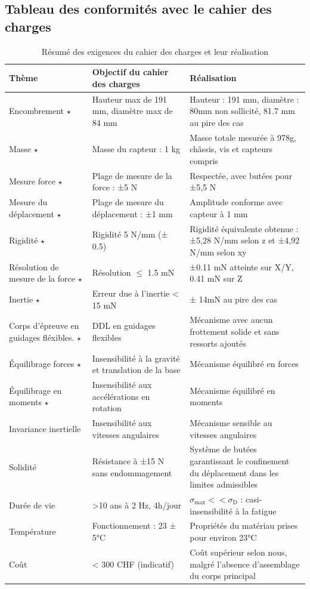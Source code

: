 \documentclass[a4paper, 11pt]{article} %
\begin{document}
\subsection{Tableau des conformités avec le cahier des charges}
\begin{table}[H]
\centering
\renewcommand{\arraystretch}{1.4} %
\begin{tabularx}{\textwidth}{|>{\raggedright\arraybackslash}p{3.5cm}|>{\raggedright\arraybackslash}X|>{\raggedright\arraybackslash}X|}
\hline
\textbf{Thème} & \textbf{Objectif du cahier des charges} & \textbf{Réalisation} \\
\hline
Encombrement $\star$  & Hauteur max de 191 mm, diamètre max de 84 mm & Hauteur : 191 mm, diamètre : 80mm non sollicité, 81.7 mm au pire des cas\\
\hline
Masse $\star$ & Masse du capteur : 1 kg & Masse totale mesurée à 978g, châssis, vis et capteurs compris  \\
\hline
Mesure force $\star$ & Plage de mesure de la force : ±5 N & Respectée, avec butées pour ±5,5 N \\
\hline
Mesure du déplacement $\star$ & Plage de mesure du déplacement : ±1 mm & Amplitude conforme avec capteur à 1 mm \\
\hline
Rigidité $\star$ & Rigidité 5 N/mm (± 0.5)& Rigidité équivalente obtenue : ±5,28 N/mm selon z et ±4,92 N/mm selon xy \\
\hline
Résolution de mesure de la force $\star$ & Résolution $\leq$ 1.5 mN & ±0.11 mN atteinte sur X/Y, 0.41 mN sur Z \\
\hline
Inertie $\star$ & Erreur due à l'inertie < 15 mN & ± 14mN au pire des cas \\
\hline
Corps d'épreuve en guidages fléxibles. $\star$ & 3 DDL en guidages flexibles & Mécanisme avec aucun frottement solide et sans ressorts ajoutés \\
\hline
Équilibrage forces $\star$ & Insensibilité à la gravité et translation de la base & Mécanisme équilibré en forces\\
\hline
Équilibrage en moments $\star$ & Insensibilité aux accélérations en rotation & Mécanisme équilibré en moments \\
\hline
Invariance inertielle & Insensibilité aux vitesses angulaires &  Mécanisme sensible au vitesses angulaires \\
\hline
Solidité & Résistance à ±15 N sans endommagement & Système de butées garantissant le confinement du déplacement dans les limites admissibles\\
\hline
Durée de vie & >10 ans à 2 Hz, 4h/jour & $\sigma_{\text{max}} << \sigma_{\text{D}}$ : casi-insensibilité à la fatigue\\
\hline
Température & Fonctionnement : 23 ± 5°C & Propriétés du matériau prises pour environ 23°C\\
\hline
Coût & < 300 CHF (indicatif) & Coût supérieur selon nous, malgré l'absence d'assemblage du corps principal \\
\hline
\end{tabularx}
\caption{Résumé des exigences du cahier des charges et leur réalisation}
\end{table}
\end{document}
